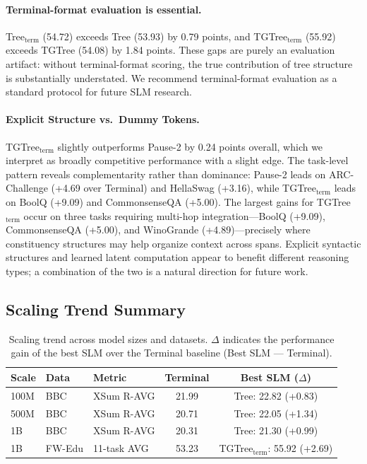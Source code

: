 \documentclass[11pt]{article}
\begin{document}
\paragraph{Terminal-format evaluation is essential.}
Tree$_{\text{term}}$ (54.72) exceeds Tree (53.93) by 0.79 points, and TGTree$_{\text{term}}$ (55.92) exceeds TGTree (54.08) by 1.84 points.
These gaps are purely an evaluation artifact: without terminal-format scoring, the true contribution of tree structure is substantially understated.
We recommend terminal-format evaluation as a standard protocol for future SLM research.

\paragraph{Explicit Structure vs.\  Dummy Tokens.}
TGTree$_{\text{term}}$ slightly outperforms Pause-2 by 0.24 points overall, which we interpret as broadly competitive performance with a slight edge.
The task-level pattern reveals complementarity rather than dominance: Pause-2 leads on ARC-Challenge (+4.69 over Terminal) and HellaSwag (+3.16), while TGTree$_{\text{term}}$ leads on BoolQ (+9.09) and CommonsenseQA (+5.00). The largest gains for TGTree$_{\text{term}}$ occur on three tasks requiring multi-hop integration---BoolQ (+9.09), CommonsenseQA (+5.00), and WinoGrande (+4.89)---precisely where constituency structures may help organize context across spans. 
Explicit syntactic structures and learned latent computation appear to benefit different reasoning types; a combination of the two is a natural direction for future work. 

\subsection{Scaling Trend Summary}

\begin{table}[htbp]
  \centering
  \setlength{\tabcolsep}{12pt}
  \begin{tabular}{lllcc}
    \toprule
    Scale & Data & Metric & Terminal & Best SLM ($\Delta$) \\
    \midrule
    100M & BBC & XSum R-AVG & 21.99 & Tree: 22.82 (+0.83) \\
    500M & BBC & XSum R-AVG & 20.71 & Tree: 22.05 (+1.34) \\
    1B & BBC & XSum R-AVG & 20.31 & Tree: 21.30 (+0.99) \\
    1B & FW-Edu & 11-task AVG & 53.23 & TGTree$_{\text{term}}$: 55.92 (+2.69) \\
    \bottomrule
  \end{tabular}
  \caption{Scaling trend across model sizes and datasets. $\Delta$ indicates the performance gain of the best SLM over the Terminal baseline (Best SLM --- Terminal).}
  \label{tab:scaling-summary}
\end{table}
\end{document}
